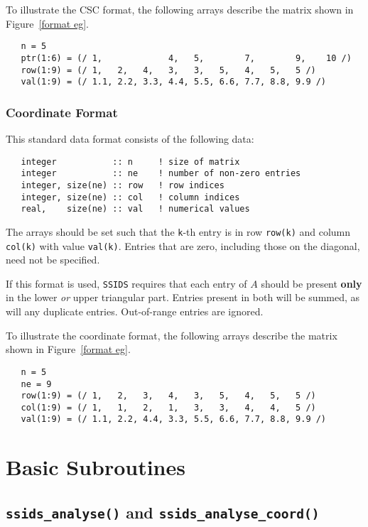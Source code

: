 \documentclass{spral}
\begin{document}
To illustrate the CSC format, the following arrays describe the matrix shown in
Figure~\ref{format eg}.
\begin{verbatim}
   n = 5
   ptr(1:6) = (/ 1,             4,   5,        7,        9,    10 /)
   row(1:9) = (/ 1,   2,   4,   3,   3,   5,   4,   5,   5 /)
   val(1:9) = (/ 1.1, 2.2, 3.3, 4.4, 5.5, 6.6, 7.7, 8.8, 9.9 /)
\end{verbatim}

\subsubsection{Coordinate Format} \label{coordformat}
This standard data format consists of the following data:
\begin{verbatim}
   integer           :: n     ! size of matrix
   integer           :: ne    ! number of non-zero entries
   integer, size(ne) :: row   ! row indices
   integer, size(ne) :: col   ! column indices
   real,    size(ne) :: val   ! numerical values
\end{verbatim}
The arrays should be set such that the \texttt{k}-th entry is in row
\texttt{row(k)} and column \texttt{col(k)} with value \texttt{val(k)}.
Entries that are zero, including those on the diagonal, need not be specified.

If this format is used,
\texttt{SSIDS} requires that each entry of $A$ should be present \textbf{only} in the
lower \textit{or} upper triangular part. Entries present in both will be summed, as
will any duplicate entries. Out-of-range entries are ignored.

To illustrate the coordinate format, the following arrays describe the matrix shown in
Figure~\ref{format eg}.
\begin{verbatim}
   n = 5
   ne = 9
   row(1:9) = (/ 1,   2,   3,   4,   3,   5,   4,   5,   5 /)
   col(1:9) = (/ 1,   1,   2,   1,   3,   3,   4,   4,   5 /)
   val(1:9) = (/ 1.1, 2.2, 4.4, 3.3, 5.5, 6.6, 7.7, 8.8, 9.9 /)
\end{verbatim}


\section{Basic Subroutines}


\subsection{\texttt{ssids\_analyse()} and \texttt{ssids\_analyse\_coord()}}\label{analyse}
\end{document}
